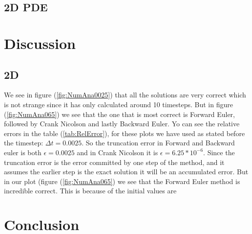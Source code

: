 \documentclass[a4paper,10pt]{article}
\begin{document}
\subsection{2D PDE}

\section{Discussion}
\subsection{2D}
We see in figure (\ref{fig:NumAna0025}) that all the solutions are very correct which is not strange since it has only calculated around 10 timesteps.
But in figure (\ref{fig:NumAna065}) we see that the one that is most correct is Forward Euler, followed by Crank Nicolson and lastly Backward Euler. 
Yo can see the relative errors in the table (\ref{tab:RelError}), for these plots we have used as stated before the timestep: $\Delta t = 0.0025$.
So the truncation error in Forward and Backward euler is both $\epsilon = 0.0025$ and in Crank Nicolson it is $\epsilon = 6.25*10^{-6}$. 
Since the truncation error is the error committed by one step of the method, and it assumes the earlier step is the exact solution it will be an accumulated error.
But in our plot (figure (\ref{fig:NumAna065}) we see that the Forward Euler method is incredible correct. This is because of the initial values are  
\section{Conclusion}
\end{document}
